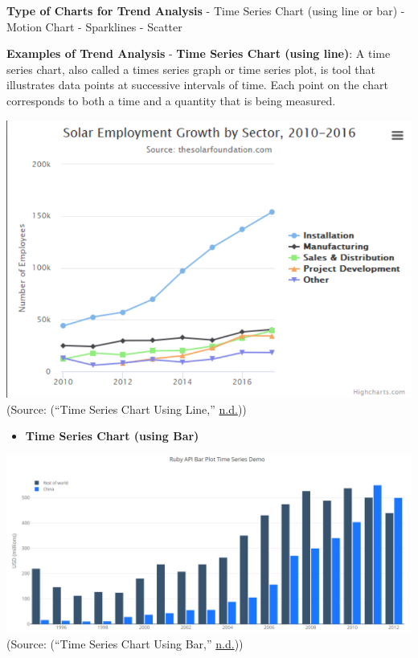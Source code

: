 \documentclass[]{book}
\providecommand{\tightlist}{%
  \setlength{\itemsep}{0pt}\setlength{\parskip}{0pt}}
\begin{document}
\textbf{Type of Charts for Trend Analysis}
- Time Series Chart (using line or bar)
- Motion Chart
- Sparklines
- Scatter

\textbf{Examples of Trend Analysis}
- \textbf{Time Series Chart (using line)}: A time series chart, also called a times series graph or time series plot, is tool that illustrates data points at successive intervals of time. Each point on the chart corresponds to both a time and a quantity that is being measured.

\includegraphics{images/Image 1.png}
(Source: (``Time Series Chart Using Line,'' \protect\hyperlink{ref-Time_Series_chart_line}{n.d.}))

\begin{itemize}
\tightlist
\item
  \textbf{Time Series Chart (using Bar)}
\end{itemize}

\includegraphics{images/Image2.png}\\
(Source: (``Time Series Chart Using Bar,'' \protect\hyperlink{ref-Time_Series_chart_bar}{n.d.}))
\end{document}
